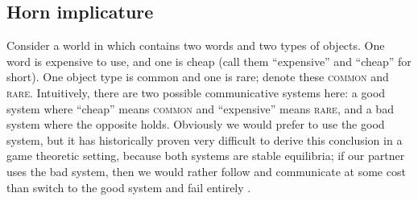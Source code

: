 \documentclass{article} %
\begin{document}
%
%

\subsection{Horn implicature}

\label{sec:horn-implicature}


Consider a world in which contains two words and two types of
objects. One word is expensive to use, and one is cheap (call them
``expensive'' and ``cheap'' for short). One object type is common and
one is rare; denote these \textsc{common} and
\textsc{rare}. Intuitively, there are two possible communicative
systems here: a good system where ``cheap'' means \textsc{common} and
``expensive'' means \textsc{rare}, and a bad system where the opposite
holds. Obviously we would prefer to use the good system, but it has
historically proven very difficult to derive this conclusion in a game
theoretic setting, because both systems are stable equilibria; if our
partner uses the bad system, then we would rather follow and
communicate at some cost than switch to the good system and fail
entirely \cite{bergen2012}.
\end{document}
